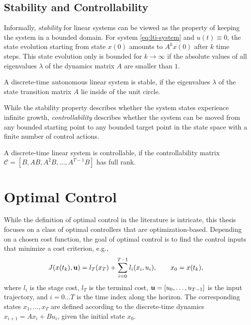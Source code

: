 \subsection{Stability and Controllability}

Informally, \emph{stability} for linear systems can be viewed as the property
of keeping the system in a bounded domain. For system
\eqref{eq:lti-system} and $u(t)\equiv 0$, the state evolution starting from
state $x(0)$ amounts to $A^k x(0)$ after $k$ time steps. This state evolution
only is bounded for $k\to\infty$ if the absolute values of all eigenvalues
$\lambda$ of the dynamics matrix $A$ are smaller than $1$.

\begin{definition}
%
A discrete-time autonomous linear system is stable, if the eigenvalues
$\lambda$ of the
state transition matrix $A$ lie inside of the unit circle.
\end{definition}

While the stability property describes whether the system states experience
infinite growth, \emph{controllability} describes whether the system can be
moved from any bounded starting point to any bounded target point in the state
space with a finite number of control actions.

\begin{definition}
%
A discrete-time linear system is controllable, if the controllability matrix
$\mathcal{C} = [B, AB, A^2B, \dots, A^{T-1}B]$ has full rank.
\end{definition}

\section{Optimal Control}

While the definition of optimal control in the literature is intricate, this
thesis focuses on a class of optimal controllers that are optimization-based.
Depending on a chosen cost function, the goal of optimal control is to find
the control inputs that minimize a cost criterion, e.g.,
\begin{equation}
  \label{eq:dp-cost}
  J(x(t_k), \u) = l_T(x_T) + \sum_{i=0}^{T-1} l_i (x_i, u_i), \qq x_0 = x(t_k),
\end{equation}
where $l_i$ is the stage cost, $l_T$ is the terminal cost, $\mathbf{u}=[u_0,
\dots, u_{T-1}]$ is the input trajectory, and $i=0\dots T$ is the time index
along the horizon. The corresponding states $x_1, \dots, x_T$ are defined
according to the discrete-time dynamics $x_{i+1} = A x_i + B u_i$, given the
initial state $x_0$.

